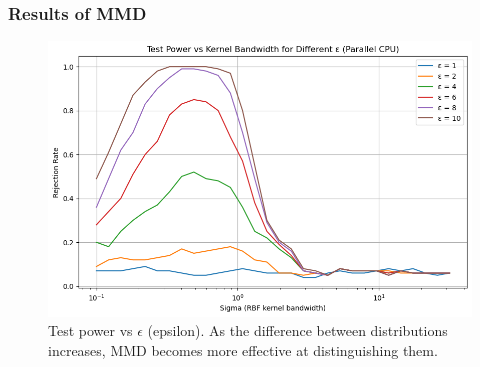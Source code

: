 \documentclass{beamer}
\begin{document}
\begin{frame}
    \frametitle{Results of MMD}
    \begin{figure}[h]
        \centering
        \includegraphics[width=0.8\linewidth]{Test_powe_vs_eps.png}
        \caption{Test power vs $\epsilon$ (epsilon). As the difference between distributions increases, MMD becomes more effective at distinguishing them.}
    \end{figure}
\end{frame}


\end{document}
